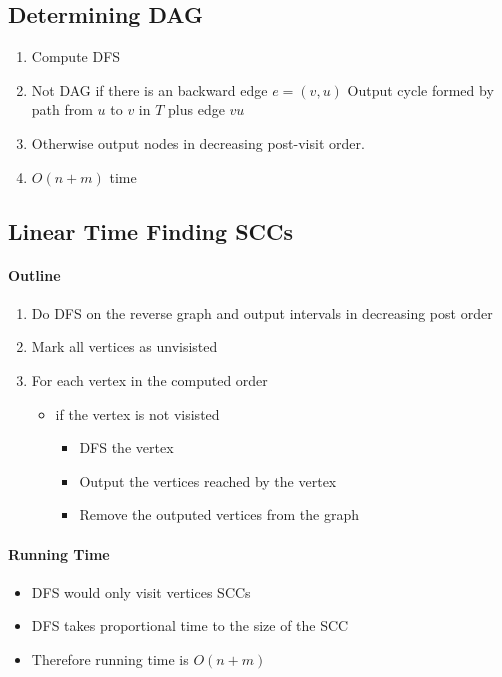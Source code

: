   \subsection{Determining DAG}

    \begin{enumerate}
      \item Compute DFS
      \item Not DAG if there is an backward edge $ e = \left( v, u \right) $
      Output cycle formed by path from $ u $ to $ v $ in $ T $ plus edge $ vu $
      \item Otherwise output nodes in decreasing post-visit order.
      \item $ O\left( n + m \right) $ time
    \end{enumerate}

  \subsection{Linear Time Finding SCCs} \label{subsec: linear time sccs}

    \paragraph{Outline}
    \begin{enumerate}
      \item Do DFS on the reverse graph and output intervals in decreasing post
      order
      \item Mark all vertices as unvisisted
      \item For each vertex in the computed order
      \begin{itemize}
        \item if the vertex is not visisted
        \begin{itemize}
          \item DFS the vertex
          \item Output the vertices reached by the vertex
          \item Remove the outputed vertices from the graph
        \end{itemize}
      \end{itemize}
    \end{enumerate}

    \paragraph{Running Time}
    \begin{itemize}
      \item DFS would only visit vertices SCCs
      \item DFS takes proportional time to the size of the SCC
      \item Therefore running time is $ O\left( n + m \right) $
    \end{itemize}

